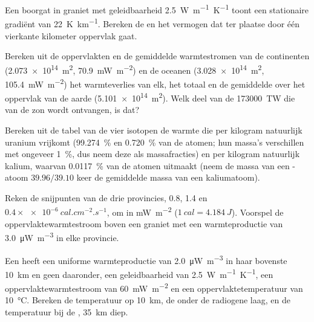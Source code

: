 \begin{exercise}[$\star$]\label{exo:b1:heat-budget:1}
Een boorgat in graniet met geleidbaarheid \qty{2.5}{W.m^{-1}.K^{-1}} toont een stationaire gradiënt van \qty{22}{K.km^{-1}}. Bereken de  en het vermogen dat ter plaatse door één vierkante kilometer oppervlak gaat.
\end{exercise}

\begin{exercise}[$\star$]\label{exo:b1:heat-budget:2}
Bereken uit de oppervlakten en de gemiddelde warmtestromen van de continenten (\qty{2.073e14}{m^2}, \qty{70.9}{mW.m^{-2}}) en de oceanen (\qty{3.028e14}{m^2}, \qty{105.4}{mW.m^{-2}}) het warmteverlies van elk, het totaal en de gemiddelde  over het oppervlak van de aarde (\qty{5.101e14}{m^2}). Welk deel van de \qty{173000}{TW} die van de zon wordt ontvangen, is dat?
\end{exercise}

\begin{exercise}[$\star$]\label{exo:b1:heat-budget:3}
Bereken uit de tabel van de vier isotopen de warmte die per kilogram natuurlijk uranium vrijkomt (\qty{99.274}{\percent}  en \qty{0.720}{\percent}  van de atomen; hun massa's verschillen met ongeveer \qty{1}{\percent}, dus neem deze als massafracties) en per kilogram natuurlijk kalium, waarvan  \qty{0.0117}{\percent} van de atomen uitmaakt (neem de massa van een -atoom $39.96/39.10$ keer de gemiddelde massa van een kaliumatoom).
\end{exercise}

\begin{exercise}[$\star$]\label{exo:b1:heat-budget:4}
Reken de snijpunten van de drie provincies, 0.8, 1.4 en
$0.4\times\qty{e-6}{cal.cm^{-2}.s^{-1}}$, om in \unit{mW.m^{-2}}
($\qty{1}{cal} = \qty{4.184}{J}$). Voorspel de oppervlaktewarmtestroom boven een graniet met een warmteproductie van \qty{3.0}{\micro W.m^{-3}} in elke provincie.
\end{exercise}

\begin{exercise}[$\star\star$]\label{exo:b1:heat-budget:5}
Een  heeft een uniforme warmteproductie van \qty{2.0}{\micro W.m^{-3}} in haar bovenste \qty{10}{km} en geen daaronder, een geleidbaarheid van \qty{2.5}{W.m^{-1}.K^{-1}}, een oppervlaktewarmtestroom van \qty{60}{mW.m^{-2}} en een oppervlaktetemperatuur van \qty{10}{\degreeCelsius}. Bereken de temperatuur op \qty{10}{km}, de  onder de radiogene laag, en de temperatuur bij de , \qty{35}{km} diep.
\end{exercise}

